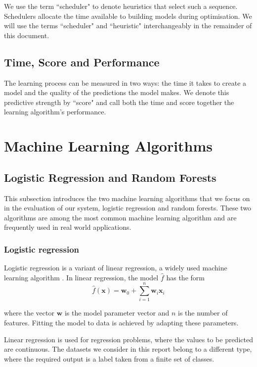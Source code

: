 \documentclass[a4paper,12pt,twoside,openright]{report}
\begin{document}
We use the term ``scheduler" to denote heuristics that select such a sequence. Schedulers allocate the time available to building models during optimisation. We will use the terms ``scheduler" and ``heuristic" interchangeably in the remainder of this document.

\subsection{Time, Score and Performance}
The learning process can be measured in two ways: the time it takes to create a model and the quality of the predictions the model makes. We denote this predictive strength by ``score" and call both the time and score together the learning algorithm's performance.

\section{Machine Learning Algorithms}
\subsection{Logistic Regression and Random Forests}
This subsection introduces the two machine learning algorithms that we focus on in the evaluation of our system, logistic regression and random forests. These two algorithms are among the most common machine learning algorithm and are frequently used in real world applications.

\subsubsection{Logistic regression}

Logistic regression is a variant of linear regression, a widely used machine learning algorithm \cite{1958, Murphy:2012:MLP:2380985}. In linear regression, the model $\hat{f}$ has the form
\begin{equation}
\hat{f}(\mathbf{x}) = \mathbf{w}_0 + \sum_{i=1}^n \mathbf{w}_i \mathbf{x}_i
\end{equation}

where the vector $\mathbf{w}$ is the model parameter vector and $n$ is the number of features. Fitting the model to data is achieved by adapting these parameters.

Linear regression is used for regression problems, where the values to be predicted are continuous. The datasets we consider in this report belong to a different type, where the required output is a label taken from a finite set of classes.
\end{document}
